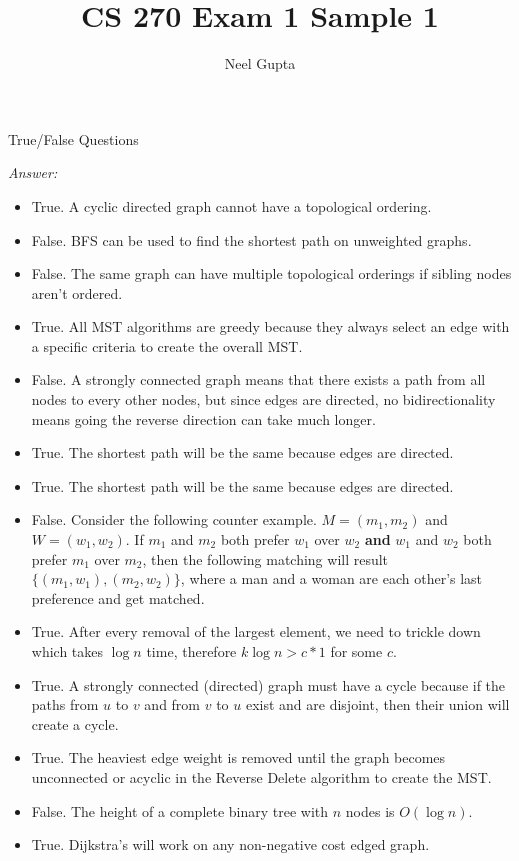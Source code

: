 \documentclass[12pt]{article}
\newenvironment{problem}[2][Problem]{\begin{trivlist}
\item[\hskip \labelsep {\bfseries #1}\hskip \labelsep {\bfseries #2.}]}{\end{trivlist}}
\begin{document}
\title{\vspace{-4cm}CS 270 Exam 1 Sample 1}
\author{Neel Gupta}
\maketitle 

\begin{problem}{1} 
    True/False Questions
\end{problem}
\textit{Answer:}
\begin{itemize}
    \item True. A cyclic directed graph cannot have a topological ordering.
    \item False. BFS can be used to find the shortest path on unweighted graphs.
    \item False. The same graph can have multiple topological orderings if sibling nodes aren't ordered.
    \item True. All MST algorithms are greedy because they always select an edge with a specific criteria to create the overall MST.
    \item False. A strongly connected graph means that there exists a path from all nodes to every other nodes, but since edges are directed, no bidirectionality means going the reverse direction can take much longer.
    \item True. The shortest path will be the same because edges are directed.
    \item True. The shortest path will be the same because edges are directed.
    \item False. Consider the following counter example. $M=(m_1,m_2)$ and $W=(w_1,w_2)$. If $m_1$ and $m_2$ both prefer $w_1$ over $w_2$ \textbf{and} $w_1$ and $w_2$ both prefer $m_1$ over $m_2$, then the following matching will result $\{(m_1,w_1),(m_2,w_2)\}$, where a man and a woman are each other's last preference and get matched.
    \item True. After every removal of the largest element, we need to trickle down which takes $\log n$ time, therefore $k \log n > c*1$ for some $c$.
    \item True. A strongly connected (directed) graph must have a cycle because if the paths from $u$ to $v$ and from $v$ to $u$ exist and are disjoint, then their union will create a cycle.
    \item True. The heaviest edge weight is removed until the graph becomes unconnected or acyclic in the Reverse Delete algorithm to create the MST.
    \item False. The height of a complete binary tree with $n$ nodes is $O(\log n)$.
    \item True. Dijkstra's will work on any non-negative cost edged graph.
\end{itemize}
\end{document}
